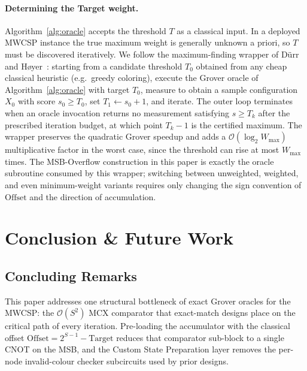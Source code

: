 \documentclass{ieeeaccess}
\begin{document}
\paragraph{Determining the Target weight.}
Algorithm~\ref{alg:oracle} accepts the threshold $T$ as a classical input. In a deployed MWCSP instance the true maximum weight is generally unknown a priori, so $T$ must be discovered iteratively. We follow the maximum-finding wrapper of D\"urr and H\o yer~\cite{durr1996minimum}: starting from a candidate threshold $T_0$ obtained from any cheap classical heuristic (e.g.\ greedy coloring), execute the Grover oracle of Algorithm~\ref{alg:oracle} with target $T_0$, measure to obtain a sample configuration $X_0$ with score $s_0 \ge T_0$, set $T_1 \leftarrow s_0 + 1$, and iterate. The outer loop terminates when an oracle invocation returns no measurement satisfying $s \ge T_k$ after the prescribed iteration budget, at which point $T_k - 1$ is the certified maximum. The wrapper preserves the quadratic Grover speedup and adds a $\mathcal{O}(\log_2 W_{\max})$ multiplicative factor in the worst case, since the threshold can rise at most $W_{\max}$ times. The MSB-Overflow construction in this paper is exactly the oracle subroutine consumed by this wrapper; switching between unweighted, weighted, and even minimum-weight variants requires only changing the sign convention of $\mathrm{Offset}$ and the direction of accumulation.

\section{Conclusion \& Future Work}

\subsection{Concluding Remarks}
This paper addresses one structural bottleneck of exact Grover oracles for the MWCSP: the $\mathcal{O}(S^2)$ MCX comparator that exact-match designs place on the critical path of every iteration. Pre-loading the accumulator with the classical offset $\text{Offset} = 2^{S-1} - \text{Target}$ reduces that comparator sub-block to a single CNOT on the MSB, and the Custom State Preparation layer removes the per-node invalid-colour checker subcircuits used by prior designs.
\end{document}
